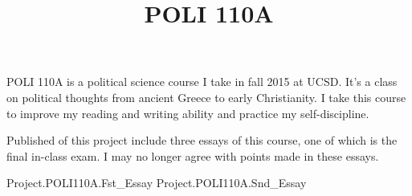 

\title{POLI 110A}

POLI 110A is a political science course I take in fall 2015 at UCSD. It’s a
class on political thoughts from ancient Greece to early Christianity. I take
this course to improve my reading and writing ability and practice my
self-discipline.


Published of this project include three essays of this course, one of which is
the final in-class exam. I may no longer agree with points made in these essays.

\@ulist
  \@item {}
                       {Project.POLI110A.Fst_Essay}
  \@item {}
                       {Project.POLI110A.Snd_Essay}
